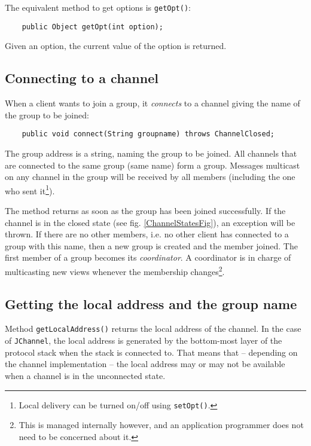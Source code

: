     The equivalent method to get options is {\tt getOpt()}:

    \begin{small}
    \begin{verbatim}
    public Object getOpt(int option);
    \end{verbatim}
    \end{small}

    Given an option, the current value of the option is returned.




    \subsection{Connecting to a channel}

    When a client wants to join a group, it {\em connects} to a channel giving the
    name of the group to be joined:

    \begin{small}
    \begin{verbatim}
    public void connect(String groupname) throws ChannelClosed;
    \end{verbatim}
    \end{small}

    The group address is a string, naming the group to be joined. All channels that
    are connected to the same group (same name) form a group. Messages multicast on
    any channel in the group will be received by all members (including the one who
    sent it\footnote{Local delivery can be turned on/off using {\tt setOpt()}.}).

    The method returns as soon as the group has been joined successfully. If the
    channel is in the closed state (see fig. \ref{ChannelStatesFig}), an exception
    will be thrown. If there are no other members, i.e. no other client has connected
    to a group with this name, then a new group is created and the member joined. The
    first member of a group becomes its {\em coordinator}. A coordinator is in charge
    of multicasting new views whenever the membership changes\footnote{This is
    managed internally however, and an application programmer does not need to be
    concerned about it.}.


    \subsection{Getting the local address and the group name}

    Method {\tt getLocalAddress()} returns the local address of the channel. In the
    case of {\tt JChannel}, the local address is generated by the bottom-most layer
    of the protocol stack when the stack is connected to. That means that --
    depending on the channel implementation -- the local address may or may not be
    available when a channel is in the unconnected state.


